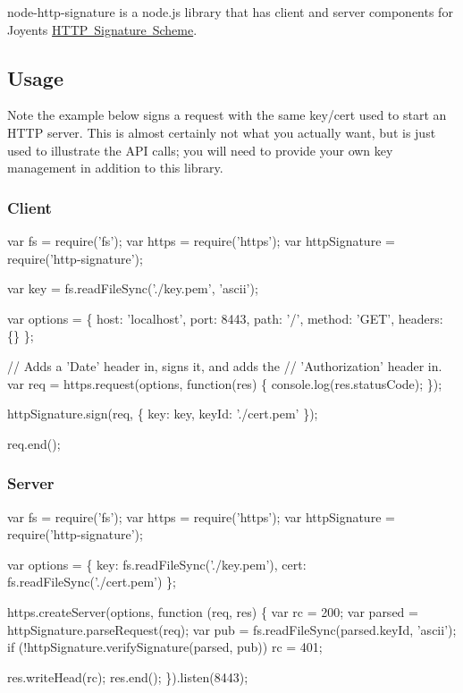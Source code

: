 node-\/http-\/signature is a node.\+js library that has client and server components for Joyent\textquotesingle{}s \mbox{\hyperlink{http__signing_8md}{H\+T\+TP Signature Scheme}}.

\subsection*{Usage}

Note the example below signs a request with the same key/cert used to start an H\+T\+TP server. This is almost certainly not what you actually want, but is just used to illustrate the A\+PI calls; you will need to provide your own key management in addition to this library.

\subsubsection*{Client}


\begin{DoxyCode}
var fs = require('fs');
var https = require('https');
var httpSignature = require('http-signature');

var key = fs.readFileSync('./key.pem', 'ascii');

var options = \{
  host: 'localhost',
  port: 8443,
  path: '/',
  method: 'GET',
  headers: \{\}
\};

// Adds a 'Date' header in, signs it, and adds the
// 'Authorization' header in.
var req = https.request(options, function(res) \{
  console.log(res.statusCode);
\});


httpSignature.sign(req, \{
  key: key,
  keyId: './cert.pem'
\});

req.end();
\end{DoxyCode}


\subsubsection*{Server}


\begin{DoxyCode}
var fs = require('fs');
var https = require('https');
var httpSignature = require('http-signature');

var options = \{
  key: fs.readFileSync('./key.pem'),
  cert: fs.readFileSync('./cert.pem')
\};

https.createServer(options, function (req, res) \{
  var rc = 200;
  var parsed = httpSignature.parseRequest(req);
  var pub = fs.readFileSync(parsed.keyId, 'ascii');
  if (!httpSignature.verifySignature(parsed, pub))
    rc = 401;

  res.writeHead(rc);
  res.end();
\}).listen(8443);
\end{DoxyCode}


